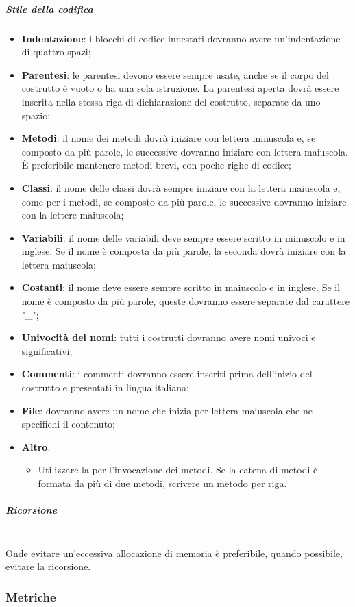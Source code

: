 \subparagraph{Stile della codifica}
\begin{itemize}
\item \textbf{Indentazione}: i blocchi di codice innestati dovranno avere un'indentazione di quattro spazi;
\item \textbf{Parentesi}: le parentesi devono essere sempre usate, anche se il corpo del costrutto è vuoto o ha una sola istruzione. La parentesi aperta dovrà essere inserita nella stessa riga di dichiarazione del costrutto, separate da uno spazio; 
\item \textbf{Metodi}: il nome dei metodi dovrà iniziare con lettera minuscola e, se composto da più parole, le successive dovranno iniziare con lettera maiuscola. È preferibile mantenere metodi brevi, con poche righe di codice;
\item \textbf{Classi}: il nome delle classi dovrà sempre iniziare con la lettera maiuscola e, come per i metodi, se composto da più parole, le successive dovranno iniziare con la lettere maiuscola;
\item \textbf{Variabili}: il nome delle variabili deve sempre essere scritto in minuscolo e in inglese. Se il nome è composta da più parole, la seconda dovrà iniziare con la lettera maiuscola;
\item \textbf{Costanti}: il nome deve essere sempre scritto in maiuscolo e in inglese. Se il nome è composto da più parole, queste dovranno essere separate dal carattere "\_";
\item \textbf{Univocità dei nomi}: tutti i costrutti dovranno avere nomi univoci e significativi;
\item \textbf{Commenti}: i commenti dovranno essere inseriti prima dell'inizio del costrutto e presentati in lingua italiana;
\item \textbf{File}: dovranno avere un nome che inizia per lettera maiuscola che ne specifichi il contenuto;
\item \textbf{Altro}:
	\begin{itemize}
		\item Utilizzare la  per l'invocazione dei metodi. Se la catena di metodi è formata da più di due metodi, scrivere un metodo per riga.
	\end{itemize}
\end{itemize}
\subparagraph{Ricorsione} \mbox{} \\
Onde evitare un'eccessiva allocazione di memoria è preferibile, quando possibile, evitare la ricorsione.

\subsubsection{Metriche}
